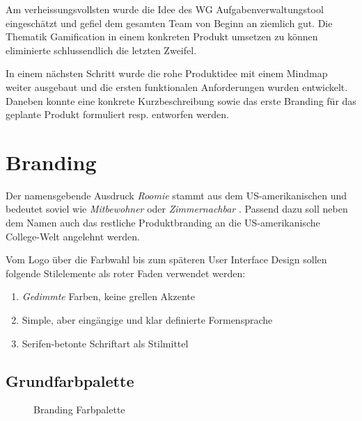 Am verheissungsvollsten wurde die Idee des \gls{WG} Aufgabenverwaltungstool eingeschätzt und gefiel dem gesamten Team von Beginn an ziemlich gut. Die Thematik \gls{Gamification} in einem konkreten Produkt umsetzen zu können eliminierte schlussendlich die letzten Zweifel.

In einem nächsten Schritt wurde die rohe Produktidee mit einem Mindmap weiter ausgebaut und die ersten funktionalen Anforderungen wurden entwickelt. Daneben konnte eine konkrete Kurzbeschreibung sowie das erste Branding für das geplante Produkt formuliert resp. entworfen werden.

\section{Branding}
\label{sec:appendix-branding}

Der namensgebende Ausdruck \emph{Roomie} stammt aus dem US-amerikanischen und bedeutet soviel wie \emph{Mitbewohner} oder \emph{Zimmernachbar} \cite{Roomie}. Passend dazu soll neben dem Namen auch das restliche Produktbranding an die US-amerikanische College-Welt angelehnt werden.

Vom Logo über die Farbwahl bis zum späteren User Interface Design sollen folgende Stilelemente als roter Faden verwendet werden:

\begin{enumerate}
	\item \emph{Gedimmte} Farben, keine grellen Akzente
	\item Simple, aber eingängige und klar definierte Formensprache
	\item Serifen-betonte Schriftart als Stilmittel
\end{enumerate}

\subsection*{Grundfarbpalette}
\begin{figure}[H]

	\caption{Branding Farbpalette}
\end{figure}

